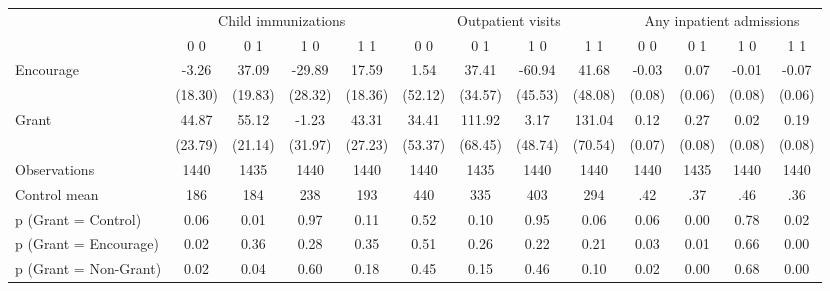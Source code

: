 \begin{tabular*}{\hsize}{@{\hskip\tabcolsep\extracolsep\fill}l*{12}{c}}
\toprule
                    &\multicolumn{4}{c}{Child immunizations}            &\multicolumn{4}{c}{Outpatient visits}              &\multicolumn{4}{c}{Any inpatient admissions}       \\\cmidrule(lr){2-5}\cmidrule(lr){6-9}\cmidrule(lr){10-13}
                    &\multicolumn{1}{c}{0 0}&\multicolumn{1}{c}{0 1}&\multicolumn{1}{c}{1 0}&\multicolumn{1}{c}{1 1}&\multicolumn{1}{c}{0 0}&\multicolumn{1}{c}{0 1}&\multicolumn{1}{c}{1 0}&\multicolumn{1}{c}{1 1}&\multicolumn{1}{c}{0 0}&\multicolumn{1}{c}{0 1}&\multicolumn{1}{c}{1 0}&\multicolumn{1}{c}{1 1}\\
\midrule
Encourage           &       -3.26&       37.09&      -29.89&       17.59&        1.54&       37.41&      -60.94&       41.68&       -0.03&        0.07&       -0.01&       -0.07\\
                    &     (18.30)&     (19.83)&     (28.32)&     (18.36)&     (52.12)&     (34.57)&     (45.53)&     (48.08)&      (0.08)&      (0.06)&      (0.08)&      (0.06)\\
\addlinespace
Grant               &       44.87&       55.12&       -1.23&       43.31&       34.41&      111.92&        3.17&      131.04&        0.12&        0.27&        0.02&        0.19\\
                    &     (23.79)&     (21.14)&     (31.97)&     (27.23)&     (53.37)&     (68.45)&     (48.74)&     (70.54)&      (0.07)&      (0.08)&      (0.08)&      (0.08)\\
\midrule
Observations        &        1440&        1435&        1440&        1440&        1440&        1435&        1440&        1440&        1440&        1435&        1440&        1440\\
Control mean        &         186&         184&         238&         193&         440&         335&         403&         294&         .42&         .37&         .46&         .36\\
p (Grant = Control) &        0.06&        0.01&        0.97&        0.11&        0.52&        0.10&        0.95&        0.06&        0.06&        0.00&        0.78&        0.02\\
p (Grant = Encourage)&        0.02&        0.36&        0.28&        0.35&        0.51&        0.26&        0.22&        0.21&        0.03&        0.01&        0.66&        0.00\\
p (Grant = Non-Grant)&        0.02&        0.04&        0.60&        0.18&        0.45&        0.15&        0.46&        0.10&        0.02&        0.00&        0.68&        0.00\\
\bottomrule
\end{tabular*}
